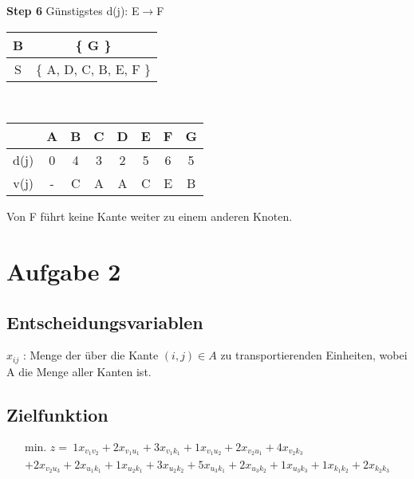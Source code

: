 \documentclass[a4paper,11pt]{article}
\begin{document}
{\begin{multicols}{2}
\textbf{Step 6} Günstigstes d(j): E$\to$F \\
\begin{tabular}{ |c|c| } 
  \hline
  B & \{ G \} \\
  \hline
  S & \{ A, D, C, B, E, F \} \\ 
  \hline
 \end{tabular} \\
\begin{tabular}{ |c|c|c|c|c|c|c|c| } 
  \hline
       & A & B & C & D & E & F & G \\
  \hline
  d(j) & 0 & 4 & 3 & 2 & 5 & 6 & 5 \\
  \hline
  v(j) & - & C & A & A & C & E & B \\
  \hline
\end{tabular}
\vspace{4mm}

Von F führt keine Kante weiter zu einem anderen Knoten.

\end{multicols}}
\vspace{10mm}


\section*{Aufgabe 2}

\subsection*{Entscheidungsvariablen}
$x_{i j}$ : Menge der über die Kante $(i,j) \in A$ zu transportierenden Einheiten, wobei A die Menge aller Kanten ist.

\subsection*{Zielfunktion}
\begin{multline*}
  \text{min. } z =~ 
      1x_{v_1 v_2}
    + 2x_{v_1 u_1}
    + 3x_{v_1 k_1}
    + 1x_{v_1 u_2}
    + 2x_{v_2 u_1}
    + 4x_{v_2 k_3} \\
    + 2x_{v_2 u_3}
    + 2x_{u_1 k_1}
    + 1x_{u_2 k_1}
    + 3x_{u_2 k_2}
    + 5x_{u_3 k_1}
    + 2x_{u_3 k_2}
    + 1x_{u_3 k_3}
    + 1x_{k_1 k_2}
    + 2x_{k_2 k_3}
\end{multline*}
\end{document}
